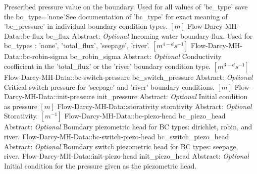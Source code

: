 \begin{RecordType}
			{{{Prescribed pressure value on the boundary. Used for all values of 'bc{\_}type' save the bc{\_}type='none'.See documentation of 'bc{\_}type' for exact meaning of 'bc{\_}pressure' in individual boundary condition types. }{$[m]$}}}
		\RecKey
			{Flow-Darcy-MH-Data::bc-flux}
			{bc{\_}flux}
			{{Abstract}{: }}
			{ \it{Optional} }
			{{{Incoming water boundary flux. Used for bc{\_}types : 'none', 'total{\_}flux', 'seepage', 'river'. }{$[m^{4-d}s^{-1}]$}}}
		\RecKey
			{Flow-Darcy-MH-Data::bc-robin-sigma}
			{bc{\_}robin{\_}sigma}
			{{Abstract}{: }}
			{ \it{Optional} }
			{{{Conductivity coefficient in the 'total{\_}flux' or the 'river' boundary condition type. }{$[m^{3-d}s^{-1}]$}}}
		\RecKey
			{Flow-Darcy-MH-Data::bc-switch-pressure}
			{bc{\_}switch{\_}pressure}
			{{Abstract}{: }}
			{ \it{Optional} }
			{{{Critical switch pressure for 'seepage' and 'river' boundary conditions. }{$[m]$}}}
		\RecKey
			{Flow-Darcy-MH-Data::init-pressure}
			{init{\_}pressure}
			{{Abstract}{: }}
			{ \it{Optional} }
			{{{Initial condition as pressure }{$[m]$}}}
		\RecKey
			{Flow-Darcy-MH-Data::storativity}
			{storativity}
			{{Abstract}{: }}
			{ \it{Optional} }
			{{{Storativity. }{$[m^{-1}]$}}}
		\RecKey
			{Flow-Darcy-MH-Data::bc-piezo-head}
			{bc{\_}piezo{\_}head}
			{{Abstract}{: }}
			{ \it{Optional} }
			{{{Boundary piezometric head for BC types: dirichlet, robin, and river.}}}
		\RecKey
			{Flow-Darcy-MH-Data::bc-switch-piezo-head}
			{bc{\_}switch{\_}piezo{\_}head}
			{{Abstract}{: }}
			{ \it{Optional} }
			{{{Boundary switch piezometric head for BC types: seepage, river.}}}
		\RecKey
			{Flow-Darcy-MH-Data::init-piezo-head}
			{init{\_}piezo{\_}head}
			{{Abstract}{: }}
			{ \it{Optional} }
			{{{Initial condition for the pressure given as the piezometric head.}}}
\end{RecordType}

